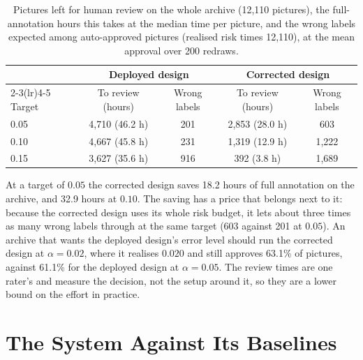 \begin{table}[!htbp]
\centering
\caption[Review effort on the whole archive]{Pictures left for human review on the whole archive (12,110 pictures), the full-annotation hours this takes at the median time per picture, and the wrong labels expected among auto-approved pictures (realised risk times 12,110), at the mean approval over 200 redraws.}
\label{tab:review_hours}
\small
\begin{tabular}{lcccc}
\toprule
& \multicolumn{2}{c}{Deployed design} & \multicolumn{2}{c}{Corrected design} \\
\cmidrule(lr){2-3}\cmidrule(lr){4-5}
Target & To review (hours) & Wrong labels & To review (hours) & Wrong labels \\
\midrule
0.05 & 4,710 (46.2 h) & 201 & 2,853 (28.0 h) & 603 \\
0.10 & 4,667 (45.8 h) & 231 & 1,319 (12.9 h) & 1,222 \\
0.15 & 3,627 (35.6 h) & 916 & 392 (3.8 h) & 1,689 \\
\bottomrule
\end{tabular}
\end{table}

At a target of $0.05$ the corrected design saves 18.2 hours of full annotation on the archive, and 32.9 hours at $0.10$. The saving has a price that belongs next to it: because the corrected design uses its whole risk budget, it lets about three times as many wrong labels through at the same target (603 against 201 at $0.05$). An archive that wants the deployed design's error level should run the corrected design at $\alpha = 0.02$, where it realises $0.020$ and still approves 63.1\% of pictures, against 61.1\% for the deployed design at $\alpha=0.05$. The review times are one rater's and measure the decision, not the setup around it, so they are a lower bound on the effort in practice.

\section{The System Against Its Baselines}
\label{sec:against_baselines}

